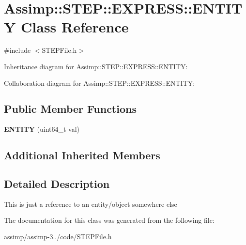 \hypertarget{class_assimp_1_1_s_t_e_p_1_1_e_x_p_r_e_s_s_1_1_e_n_t_i_t_y}{\section{Assimp\+:\+:S\+T\+E\+P\+:\+:E\+X\+P\+R\+E\+S\+S\+:\+:E\+N\+T\+I\+T\+Y Class Reference}
\label{class_assimp_1_1_s_t_e_p_1_1_e_x_p_r_e_s_s_1_1_e_n_t_i_t_y}
}


{\ttfamily \#include $<$S\+T\+E\+P\+File.\+h$>$}



Inheritance diagram for Assimp\+:\+:S\+T\+E\+P\+:\+:E\+X\+P\+R\+E\+S\+S\+:\+:E\+N\+T\+I\+T\+Y\+:


Collaboration diagram for Assimp\+:\+:S\+T\+E\+P\+:\+:E\+X\+P\+R\+E\+S\+S\+:\+:E\+N\+T\+I\+T\+Y\+:
\subsection*{Public Member Functions}
\begin{DoxyCompactItemize}
\item 
\hypertarget{class_assimp_1_1_s_t_e_p_1_1_e_x_p_r_e_s_s_1_1_e_n_t_i_t_y_a8e6b080b755e21ed53169df73ad7c225}{{\bfseries E\+N\+T\+I\+T\+Y} (uint64\+\_\+t val)}\label{class_assimp_1_1_s_t_e_p_1_1_e_x_p_r_e_s_s_1_1_e_n_t_i_t_y_a8e6b080b755e21ed53169df73ad7c225}

\end{DoxyCompactItemize}
\subsection*{Additional Inherited Members}


\subsection{Detailed Description}
This is just a reference to an entity/object somewhere else 

The documentation for this class was generated from the following file\+:\begin{DoxyCompactItemize}
\item 
assimp/assimp-\/3../code/S\+T\+E\+P\+File.\+h\end{DoxyCompactItemize}
